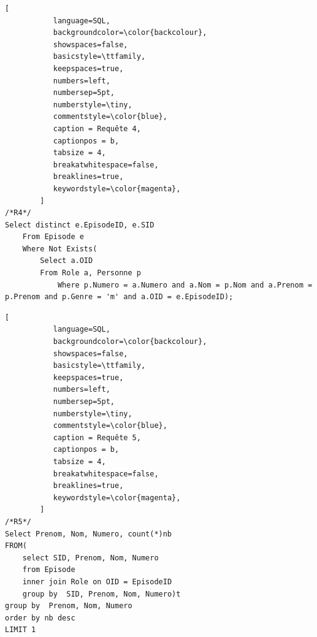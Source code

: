 \documentclass[10pt,a4paper]{article}
\begin{document}
\begin{lstlisting}[
           language=SQL,
           backgroundcolor=\color{backcolour},
           showspaces=false,
           basicstyle=\ttfamily,
           keepspaces=true,                 
           numbers=left,                    
           numbersep=5pt,
           numberstyle=\tiny,
           commentstyle=\color{blue},
           caption = Requête 4,
           captionpos = b,
           tabsize = 4,
           breakatwhitespace=false,         
    	   breaklines=true,
           keywordstyle=\color{magenta},
        ]
/*R4*/
Select distinct e.EpisodeID, e.SID 
	From Episode e 
    Where Not Exists( 
        Select a.OID 
        From Role a, Personne p 
        	Where p.Numero = a.Numero and a.Nom = p.Nom and a.Prenom = p.Prenom and p.Genre = 'm' and a.OID = e.EpisodeID);    
\end{lstlisting}
\begin{lstlisting}[
           language=SQL,
           backgroundcolor=\color{backcolour},
           showspaces=false,
           basicstyle=\ttfamily,
           keepspaces=true,                 
           numbers=left,                    
           numbersep=5pt,
           numberstyle=\tiny,
           commentstyle=\color{blue},
           caption = Requête 5,
           captionpos = b,
           tabsize = 4,
           breakatwhitespace=false,         
    	   breaklines=true,
           keywordstyle=\color{magenta},
        ]
/*R5*/
Select Prenom, Nom, Numero, count(*)nb
FROM(
	select SID, Prenom, Nom, Numero
	from Episode
	inner join Role on OID = EpisodeID
	group by  SID, Prenom, Nom, Numero)t
group by  Prenom, Nom, Numero
order by nb desc
LIMIT 1
   
\end{lstlisting}
\newpage
\end{document}
